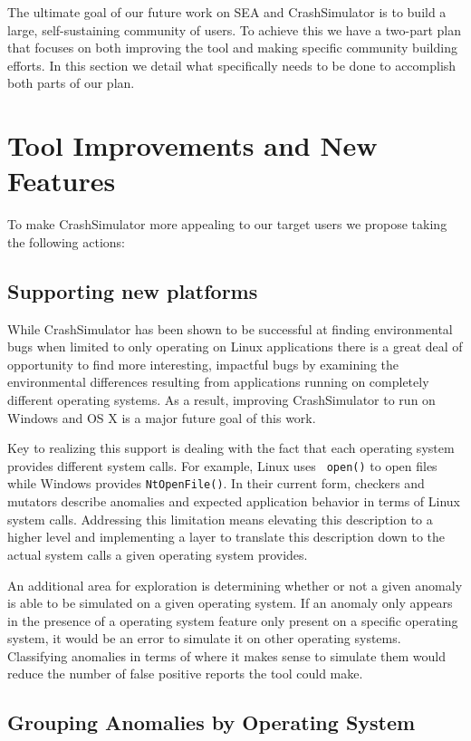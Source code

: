 \documentclass[twocolumn]{article}
\begin{document}
The ultimate goal of our future work on SEA and CrashSimulator is to build
a large, self-sustaining community of users.  To achieve this we have a
two-part plan that focuses on both improving the tool and making specific
community building efforts.  In this section we detail what specifically
needs to be done to accomplish both parts of our plan.


\section{Tool Improvements and New Features}

To make CrashSimulator more appealing to our target users we propose taking
the following actions:


\subsection{Supporting new platforms}

While CrashSimulator has been shown to be successful at finding
environmental bugs when limited to only operating on Linux applications
there is a great deal of opportunity to find more interesting, impactful
bugs by examining the environmental differences resulting from applications
running on completely different operating systems.  As a result, improving
CrashSimulator to run on Windows and OS X is a major future goal of this
work.

Key to realizing this support is dealing with the fact that each operating
system provides different system calls.  For example, Linux uses {\tt
open()} to open files while Windows provides {\tt NtOpenFile()}.  In their
current form, checkers and mutators describe anomalies and expected
application behavior in terms of Linux system calls.  Addressing this
limitation means elevating this description to a higher level and
implementing a layer to translate this description down to the actual
system calls a given operating system provides.

An additional area for exploration is determining whether or not a given
anomaly is able to be simulated on a given operating system.  If an anomaly
only appears in the presence of a operating system feature only present on
a specific operating system, it would be an error to simulate it on other
operating systems.  Classifying anomalies in terms of where it makes sense
to simulate them would reduce the number of false positive reports the tool
could make.


\subsection{Grouping Anomalies by Operating System}
\end{document}
